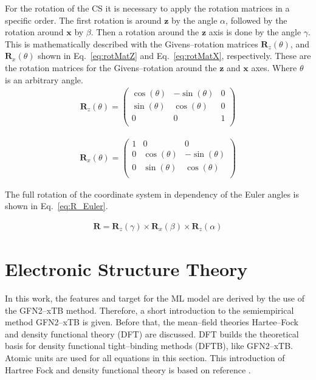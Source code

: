 For the rotation of the CS it is necessary to apply the rotation matrices in a specific order.
The first rotation is around $\textbf{z}$ by the angle $\alpha$, followed by the rotation around $\textbf{x}$ by $\beta$.
Then a rotation around the $\textbf{z}$ axis is done by the angle $\gamma$.\\
This is mathematically described with the Givens--rotation matrices $\textbf{R}_z(\theta)$, and $\textbf{R}_x(\theta)$ shown in Eq.~\eqref{eq:rotMatZ} and Eq.~\eqref{eq:rotMatX}, respectively.
These are the rotation matrices for the Givens--rotation around the $\textbf{z}$ and $\textbf{x}$ axes.
Where $\theta$ is an arbitrary angle.
\begin{align}
	\label{eq:rotMatZ}
	\textbf{R}_z (\theta)  = \left(\begin{matrix}
					\cos(\theta) & -\sin(\theta) & 0 \\
					\sin(\theta) & \cos(\theta) & 0 \\
					0 & 0 & 1 \\
					\end{matrix} \right)
\end{align}

\begin{align}
	\label{eq:rotMatX}
	\textbf{R}_x (\theta)  = \left(\begin{matrix}
						1 & 0 & 0 \\
						0 & \cos(\theta) & -\sin(\theta)  \\
						0 & \sin(\theta) & \cos(\theta) \\
					\end{matrix} \right)
\end{align}

The full rotation of the coordinate system in dependency of the Euler angles is shown in Eq.~\eqref{eq:R_Euler}.

\begin{align}
	\label{eq:R_Euler}
	\textbf{R} = \textbf{R}_z (\gamma) \times \textbf{R}_x (\beta) \times \textbf{R}_z (\alpha)
\end{align}

\section{Electronic Structure Theory}
In this work, the features and target for the ML model are derived by the use of the \mbox{GFN2--xTB} method.
Therefore, a short introduction to the semiempirical method GFN2--xTB is given.
Before that, the mean--field theories Hartee--Fock and density functional theory (DFT) are discussed.
DFT builds the theoretical basis for density functional tight--binding methods (DFTB), like \mbox{GFN2--xTB}.
Atomic units are used for all equations in this section.
This introduction of Hartree Fock and density functional theory is based on reference \cite{Jensen2013}.

